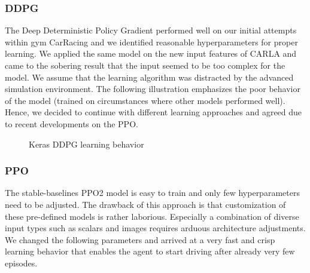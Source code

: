\documentclass[letterpaper, 10 pt, conference]{ieeeconf}  %
\begin{document}
\subsubsection{DDPG}
The Deep Deterministic Policy Gradient performed well on our initial attempts within gym CarRacing 
and we identified reasonable hyperparameters for proper learning. We applied the same model 
on the new input features of CARLA and came to the sobering result that the input seemed to be 
too complex for the model. We assume that the learning algorithm was distracted by the advanced 
simulation environment. The following illustration emphasizes the poor behavior of the model 
(trained on circumstances where other models performed well). Hence, we decided to continue with 
different learning approaches and agreed due to recent developments on the PPO.
\begin{figure}[thpb]
	\centering
	\caption{Keras DDPG learning behavior}
	\label{figurelabel}
\end{figure}

\subsubsection{PPO}
The stable-baselines PPO2 model is easy to train and only few hyperparameters need 
to be adjusted. The drawback of this approach is that customization of these pre-defined 
models is rather laborious. Especially a combination of diverse input types such as scalars and 
images requires arduous architecture adjustments. We changed the following parameters and arrived 
at a very fast and crisp learning behavior that enables the agent to start driving after already very few episodes.
\end{document}
